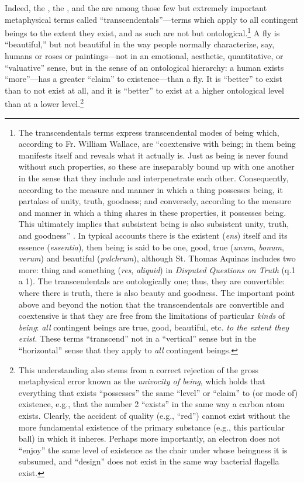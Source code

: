 Indeed, the , the , and the  are among those few but extremely important metaphysical terms called ``transcendentals''---terms which apply to all contingent beings to the extent they exist, and as such are not  but ontological.\footnote{The transcendentals terms express transcendental modes of being which, according to Fr. William Wallace, are ``coextensive with being; in them being manifests itself and reveals what it actually is. Just as being is never found without such properties, so these are inseparably bound up with one another in the sense that they include and interpenetrate each other. Consequently, according to the measure and manner in which a thing possesses being, it partakes of unity, truth, goodness; and conversely, according to the measure and manner in which a thing shares in these properties, it possesses being. This ultimately implies that subsistent being is also subsistent unity, truth, and goodness'' \citep[][p. 85]{ephil}.  In typical accounts there is the existent (\textit{ens}) itself and its essence (\textit{essentia}), then being is said to be one, good, true (\textit{unum}, \textit{bonum}, \textit{verum}) and beautiful (\textit{pulchrum}), although St. Thomas Aquinas includes two more: thing and something (\textit{res}, \textit{aliquid}) in \textit{Disputed Questions on Truth} (q.1 a 1). The transcendentals are ontologically one; thus, they are convertible: where there is truth, there is also beauty and goodness. The important point above and beyond the notion that the transcendentals are convertible and coextensive is that they are free from the limitations of particular \textit{kinds} of \textit{being}: \textit{all} contingent beings are true, good, beautiful, etc. \textit{to the extent they exist}. These terms ``transcend'' not in a ``vertical'' sense but in the ``horizontal'' sense that they apply to \textit{all} contingent beings.} 
A fly is ``beautiful,'' but not beautiful in the way people normally characterize, say, humans or roses or paintings---not in an emotional, aesthetic, quantitative, or ``valuative'' sense, but in the sense of an ontological hierarchy: a human exists ``more''---has a greater ``claim'' to existence---than a fly. It is ``better'' to exist than to not exist at all, and it is ``better'' to exist at a higher ontological level than at a lower level.\footnote{This understanding also stems from a correct rejection of the gross metaphysical error known as the \textit{univocity of being}, which holds that everything that exists ``possesses'' the same ``level'' or ``claim'' to (or mode of) existence, e.g., that the number 2 ``exists'' in the same way a carbon atom exists. Clearly, the accident of quality (e.g., ``red'') cannot exist without the more fundamental existence of the primary substance (e.g., this particular ball) in which it inheres. Perhaps more importantly, an electron does not ``enjoy'' the same level of existence as the chair under whose beingness it is subsumed, and ``design'' does not exist in the same way bacterial flagella exist.} 


